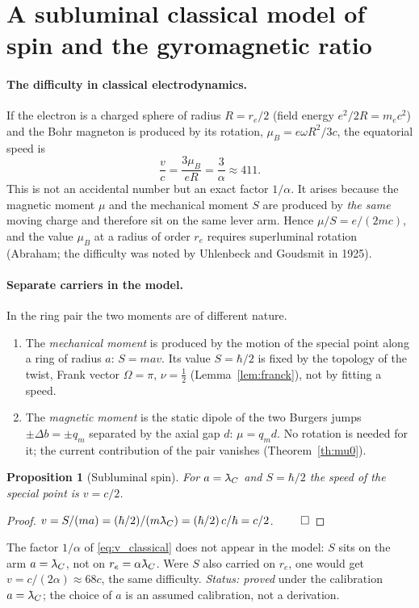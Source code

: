 \documentclass[12pt,a4paper]{article}
\newtheorem{proposition}{Proposition}
\providecommand{\lambdabar}{{\mkern0.75mu\mathchar'26\mkern-9.75mu\lambda}}
\begin{document}
\section{A subluminal classical model of spin and the gyromagnetic ratio}
\label{sec:spin_subluminal}

\paragraph{The difficulty in classical electrodynamics.} If the electron is a
charged sphere of radius $R=r_e/2$ (field energy $e^2/2R=m_ec^2$) and the Bohr
magneton is produced by its rotation, $\mu_B=e\omega R^2/3c$, the equatorial speed is
\begin{equation}
\frac{v}{c}=\frac{3\mu_B}{eR}=\frac{3}{\alpha}\approx411 .
\label{eq:v_classical}
\end{equation}
This is not an accidental number but an exact factor $1/\alpha$. It arises because
the magnetic moment $\mu$ and the mechanical moment $S$ are produced by \emph{the same}
moving charge and therefore sit on the same lever arm. Hence $\mu/S=e/(2mc)$, and
the value $\mu_B$ at a radius of order $r_e$ requires superluminal rotation (Abraham;
the difficulty was noted by Uhlenbeck and Goudsmit in 1925).

\paragraph{Separate carriers in the model.} In the ring pair the two moments are of
different nature.
\begin{enumerate}[nosep]
\item The \emph{mechanical moment} is produced by the motion of the special point
along a ring of radius $a$: $S=mav$. Its value $S=\hbar/2$ is fixed by the topology of
the twist, Frank vector $\Omega=\pi$, $\nu=\tfrac12$ (Lemma~\ref{lem:franck}), not
by fitting a speed.
\item The \emph{magnetic moment} is the static dipole of the two Burgers jumps
$\pm\Delta b=\pm q_m$ separated by the axial gap $d$: $\mu=q_md$. No rotation is
needed for it; the current contribution of the pair vanishes
(Theorem~\ref{th:mu0}).
\end{enumerate}

\begin{proposition}[Subluminal spin]
\label{prop:subluminal}
For $a=\lambdabar_C$ and $S=\hbar/2$ the speed of the special point is $v=c/2$.
\end{proposition}
\begin{proof}
$v=S/(ma)=(\hbar/2)/(m\lambdabar_C)=(\hbar/2)\,c/\hbar=c/2$. $\qed$
\end{proof}
The factor $1/\alpha$ of \eqref{eq:v_classical} does not appear in the model: $S$ sits
on the arm $a=\lambdabar_C$, not on $r_e=\alpha\lambdabar_C$. Were $S$ also carried on
$r_e$, one would get $v=c/(2\alpha)\approx68c$, the same difficulty.
\emph{Status: proved} under the calibration $a=\lambdabar_C$; the choice of $a$ is an
assumed calibration, not a derivation.
\end{document}

